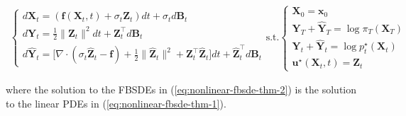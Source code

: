 \documentclass{article}
\begin{document}
{\begin{small}
\begin{align}
\begin{cases}
    d\boldsymbol{X}_t=\left(\boldsymbol{f}(\boldsymbol{X}_t,t)+ \sigma_t \boldsymbol{Z}_t\right)dt+\sigma_t d\boldsymbol{B}_t\\
    d\boldsymbol{Y}_t=\frac{1}{2}\|\boldsymbol{Z}_t\|^2dt+\boldsymbol{Z}_t^\top d \boldsymbol{B}_t\\
    d\widehat{\boldsymbol{Y}}_t=\big[\nabla\cdot (\sigma_t\widehat{\boldsymbol{Z}}_t-\boldsymbol{f})+\frac{1}{2}\|\widehat{\boldsymbol{Z}}_t\|^2+ \boldsymbol{Z}_t^\top \widehat{\boldsymbol{Z}}_t\big]dt+\widehat{\boldsymbol{Z}}_t^\top d \boldsymbol{B}_t
\end{cases}\text{s.t.}\begin{cases}
    \boldsymbol{X}_0=\boldsymbol{x}_0\\
    \boldsymbol{Y}_T+\widehat{\boldsymbol{Y}}_T=\log \pi_T(\boldsymbol{X}_T)\\
    \boldsymbol{Y}_t+\widehat{\boldsymbol{Y}}_t=\log p^\star_t(\boldsymbol{X}_t)\\
    \boldsymbol{u}^\star(\boldsymbol{X}_t,t)=\boldsymbol{Z}_t
\end{cases}\label{eq:nonlinear-fbsde-thm-2}
\end{align}
\end{small}

where the solution to the FBSDEs in (\ref{eq:nonlinear-fbsde-thm-2}) is the solution to the linear PDEs in (\ref{eq:nonlinear-fbsde-thm-1}).
}
\end{document}
